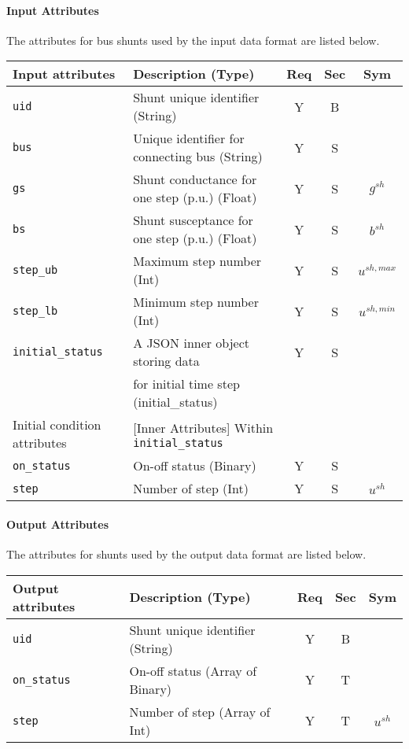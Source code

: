 \documentclass{article}
\begin{document}
\paragraph{Input Attributes} The attributes for bus shunts used by the input data format are listed below.
\begin{center}
\small

\begin{tabular}{ l | l | c | c | c | }
Input attributes & Description (Type) & Req & Sec & Sym\\
\hline
  {\tt uid} & Shunt unique identifier (String) & Y & B &  \\
  {\tt bus} & Unique identifier for connecting bus (String)& Y & S &  \\
{\tt gs}  & Shunt conductance for one step (p.u.) (Float) & Y & S & $g^{sh}$ \\
{\tt bs}  & Shunt susceptance for one step (p.u.) (Float) & Y & S & $b^{sh}$ \\
  {\tt step\_ub}      & Maximum step number (Int)  & Y & S & $u^{sh,max}$\\
  {\tt step\_lb}      & Minimum step number (Int)  & Y & S & $u^{sh,min}$\\
  {\tt initial\_status} & A JSON inner object storing data  & Y & S &  \\
       & for initial time step (initial\_status) &  &  &  \\
  \hline
  Initial condition attributes & [Inner Attributes] Within {\tt initial\_status} & & & \\
  \hline
  {\tt on\_status} & On-off status (Binary) & Y & S & \\
  {\tt step}       & Number of step (Int)  & Y  & S &$u^{sh}$\\  
\hline
\end{tabular}
\end{center}

\paragraph{Output Attributes} The attributes for shunts used by the output data format are listed below.

\begin{center}
\small
\begin{tabular}{ l | l | c | c | c |}
Output attributes & Description (Type) & Req & Sec & Sym\\
\hline
  {\tt uid} & Shunt unique identifier (String) & Y & B & \\
  {\tt on\_status} & On-off status (Array of Binary) & Y & T & \\
  {\tt step}      & Number of step (Array of Int)  & Y  & T &$u^{sh}$\\
\hline
\end{tabular}
\end{center}
\end{document}
